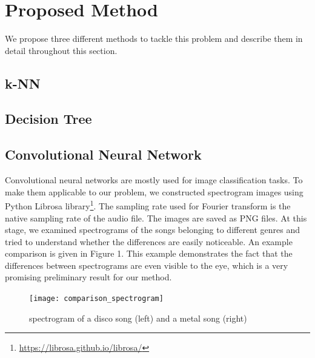 \documentclass[acmtog, authorversion]{acmart}
\begin{document}
\section{Proposed Method}
We propose three different methods to tackle this problem and describe them in detail throughout this section.
\subsection{k-NN}
\subsection{Decision Tree}
\subsection{Convolutional Neural Network}
Convolutional neural networks are mostly used for image classification tasks. To make them applicable to our problem, we constructed spectrogram images using
Python Librosa library\footnote{\url{https://librosa.github.io/librosa/}}. The sampling rate used for Fourier transform is the native sampling rate of the 
audio file. The images are saved as PNG files. At this stage, we examined spectrograms of the songs belonging to different genres and tried to understand 
whether the differences are easily noticeable. An example comparison is given in Figure 1. This example demonstrates the fact that the differences between spectrograms are even visible to the eye, which is a very promising preliminary result for 
our method.\\
\begin{figure}[h!]
  \centering
  \texttt{[image: comparison\_spectrogram]}
  \caption{spectrogram of a disco song (left) and a metal song (right)}
  \end{figure}
\end{document}
